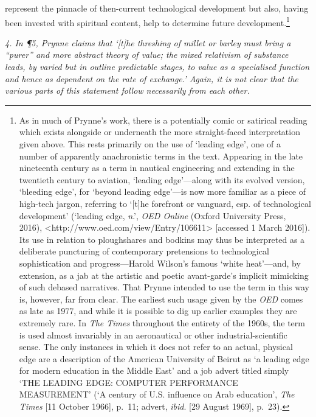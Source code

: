 \documentclass[]{article}
\begin{document}
represent the pinnacle of then-current technological development but
also, having been invested with spiritual content, help to determine
future development.\footnote{As in much of Prynne’s work, there is a
  potentially comic or satirical reading which exists alongside or
  underneath the more straight-faced interpretation given above. This
  rests primarily on the use of ‘leading edge’, one of a number of
  apparently anachronistic terms in the text. Appearing in the late
  nineteenth century as a term in nautical engineering and extending in
  the twentieth century to aviation, ‘leading edge’—along with its
  evolved version, ‘bleeding edge’, for ‘beyond leading edge’—is now
  more familiar as a piece of high-tech jargon, referring to ‘{[}t{]}he
  forefront or vanguard, esp. of technological development’ (‘leading
  edge, \emph{n}.’, \emph{OED Online} (Oxford University Press, 2016),
  \textless{}http://www.oed.com/view/Entry/106611\textgreater{}
  {[}accessed 1 March 2016{]}). Its use in relation to ploughshares and
  bodkins may thus be interpreted as a deliberate puncturing of
  contemporary pretensions to technological sophistication and
  progress—Harold Wilson’s famous ‘white heat’—and, by extension, as a
  jab at the artistic and poetic avant-garde’s implicit mimicking of
  such debased narratives. That Prynne intended to use the term in this
  way is, however, far from clear. The earliest such usage given by the
  \emph{OED} comes as late as 1977, and while it is possible to dig up
  earlier examples they are extremely rare. In \emph{The Times}
  throughout the entirety of the 1960s, the term is used almost
  invariably in an aeronautical or other industrial-scientific sense.
  The only instances in which it does not refer to an actual, physical
  edge are a description of the American University of Beirut as ‘a
  leading edge for modern education in the Middle East’ and a job advert
  titled simply ‘THE LEADING EDGE: \textbar{} COMPUTER PERFORMANCE
  MEASUREMENT’ (‘A century of U.S. influence on Arab education’,
  \emph{The Times} {[}11 October 1966{]}, p.~11; advert, \emph{ibid}.
  {[}29 August 1969{]}, p.~23).}

\emph{4. In ¶5, Prynne claims that ‘{[}t{]}he threshing of millet or
barley must bring a “purer” and more abstract theory of value; the mixed
relativism of substance leads, by varied but in outline predictable
stages, to value as a specialised function and hence as dependent on the
rate of exchange.’ Again, it is not clear that the various parts of this
statement follow necessarily from each other.}
\end{document}
